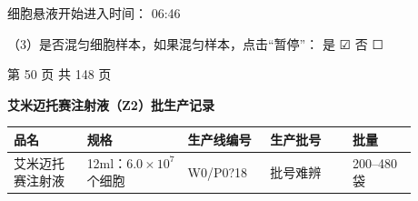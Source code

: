 \documentclass[UTF8,10pt,a4paper,fontset=fandol]{ctexart}
\newcommand{\fieldvalue}[1]{#1}
\newcommand{\handwritten}[1]{#1}
\newcommand{\checkboxfield}[1]{\ifstrequal{#1}{checked}{☑}{\ifstrequal{#1}{unclear}{?}{☐}}}
\begin{document}
\hfill
细胞悬液开始进入时间：
\fieldvalue{\handwritten{06:46}}

\noindent
（3）是否混匀细胞样本，如果混匀样本，点击“暂停”：
是
\fieldvalue{\handwritten{\checkboxfield{checked}}}
\quad
否
\fieldvalue{\checkboxfield{unchecked}}

\vfill

\begin{center}
第 50 页 共 148 页
\end{center}

\newpage

\begin{center}
    {\large\textbf{艾米迈托赛注射液（Z2）批生产记录}}
\end{center}

\begin{tabular}{|p{0.16\linewidth}|p{0.22\linewidth}|p{0.18\linewidth}|p{0.18\linewidth}|p{0.14\linewidth}|}
\hline
\centering 品名 & \centering 规格 & \centering 生产线编号 & \centering 生产批号 & \centering 批量 \tabularnewline
\hline
\fieldvalue{艾米迈托赛注射液}
&
\fieldvalue{12ml：$6.0\times10^{7}$个细胞}
&
\fieldvalue{\handwritten{W0/P0?18}}
&
\fieldvalue{\handwritten{批号难辨}}
&
\fieldvalue{200--480袋}
\tabularnewline
\hline
\end{tabular}

\vspace{0.4em}
\end{document}
